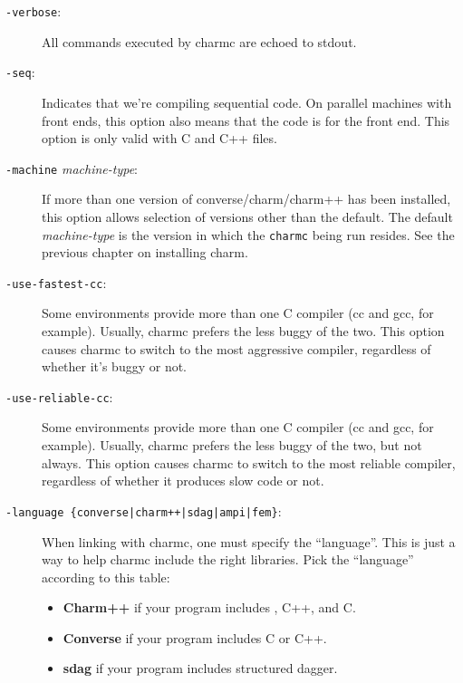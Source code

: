 \begin{description}
\item[{\tt -verbose}:]

All commands executed by charmc are echoed to stdout.

\item[{\tt -seq}:]

Indicates that we're compiling sequential code.  On parallel machines
with front ends, this option also means that the code is for the front
end.  This option is only valid with C and C++ files.

\item[{\tt -machine} {\em machine-type}:]

If more than one version of converse/charm/charm++ has been installed,
this option allows selection of versions other than the default.  The
default {\em machine-type} is the version in which the {\tt charmc}
being run resides.  See the previous chapter on installing charm.

\item[{\tt -use-fastest-cc}:]

Some environments provide more than one C compiler (cc and gcc, for
example).  Usually, charmc prefers the less buggy of the two.  This
option causes charmc to switch to the most aggressive compiler,
regardless of whether it's buggy or not.

\item[{\tt -use-reliable-cc}:]

Some environments provide more than one C compiler (cc and gcc, for
example).  Usually, charmc prefers the less buggy of the two, but
not always.  This option causes charmc to switch to the most reliable
compiler, regardless of whether it produces slow code or not.

\item[{\tt -language \{converse|charm++|sdag|ampi|fem\}}:]

When linking with charmc, one must specify the ``language''.  This
is just a way to help charmc include the right libraries.  Pick the
``language'' according to this table:

\begin{itemize}
\item{{\bf Charm++} if your program includes \charmpp{}, C++, and C.}
\item{{\bf Converse} if your program includes C or C++.}
\item{{\bf sdag} if your program includes structured dagger.}
\end{itemize}


\end{description}
